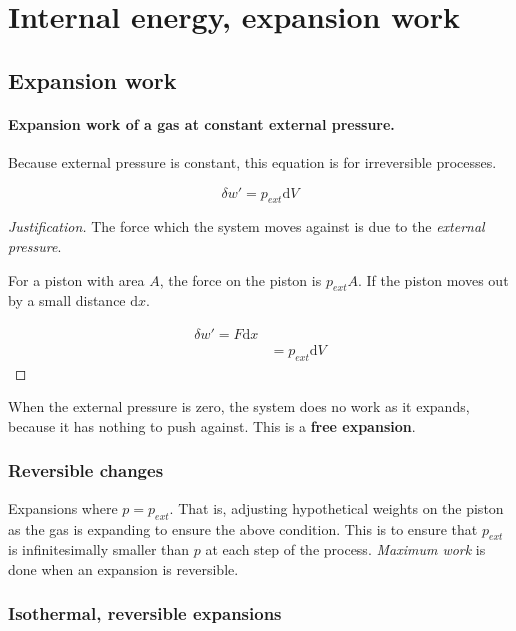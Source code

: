 \documentclass{article}
\numberwithin{theorem}{section}
\numberwithin{corollary}{section}
\numberwithin{postulate}{section}
\numberwithin{lemma}{section}
\numberwithin{definition}{section}
\newenvironment{justification} {\begin{proof}[Justification]} {\end{proof}}
\begin{document}
\section{Internal energy, expansion work}

\subsection{Expansion work} 

\paragraph{Expansion work of a gas at constant external pressure.} Because
external pressure is constant, this equation is for irreversible processes.

\begin{equation}
  \delta w' = p_{ext} \mathrm{d}V
\end{equation}

\begin{justification}
  The force which the system moves against is due to the \textit{external
  pressure}.

  For a piston with area $A$, the force on the piston is $p_{ext}A$. If the
  piston moves out by a small distance $\mathrm{d}x$.

  \begin{equation*}
  \begin{split}
    \delta w' = F\mathrm{d}x \\
    & = p_{ext} \mathrm{d}V
  \end{split}
\end{equation*}

\end{justification}

When the external pressure is zero, the system does no work as it expands,
because it has nothing to push against. This is a \textbf{free expansion}.

\subsubsection{Reversible changes}
Expansions where $p = p_{ext}$. That is, adjusting hypothetical weights on the
piston as the gas is expanding to ensure the above condition. This is to ensure
that $p_{ext}$ is infinitesimally smaller than $p$ at each step of the process.
\textit{Maximum work} is done when an expansion is reversible.

\subsubsection{Isothermal, reversible expansions}
\end{document}
